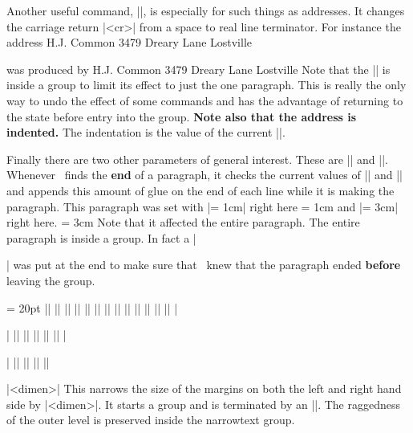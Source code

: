 Another useful command, |\obeylines|, is especially for such things as
addresses.
It changes the carriage return |<cr>| from a space to real line
terminator. For instance the address
\medskip
\vbox{
\begingroup
\obeylines
H.J. Common
3479 Dreary Lane
Lostville
\endgroup
}

\noindent
was produced by 
\begintt
\begingroup
\obeylines
H.J. Common
3479 Dreary Lane
Lostville
\endgroup
\endtt
\noindent
Note that the |\obeylines| is inside a group to limit its effect to just the
one paragraph. This is really the only way to undo the effect of some
commands and  has the advantage of returning to the state before entry into
the group. {\bf Note also that the address is indented.} 
The indentation is the
value of the current |\parindent|. 

\begingroup
Finally there are two other parameters of general interest. These are
|\rightskip| and |\leftskip|. Whenever \tex\ finds the {\bf end} of a
paragraph, it  checks  the current values of |\rightskip| and
|\leftskip| and appends this amount of glue on the end of each line while it
is  making the paragraph. This paragraph was set with |\rightskip = 1cm|
right here 
\rightskip = 1cm
and |\leftskip = 3cm| right here.
\leftskip = 3cm
Note that it affected the entire paragraph. The entire paragraph is inside a
group. In fact a |\par \endgroup| was put at the end to make sure that 
\tex\ knew that the paragraph ended {\bf before} leaving the group.
\par
\endgroup 


\beginthreecolumn
\hfuzz = 20pt
\ext|\beginnarrowtext|
\pri|\discretionary|
\ext|\endnarrowtext|
\pri|\everyparagraph|
\pri|\hangafter|
\pri|\hangindent|
\ext|\hyphenatecapitals|
\pri|\indent|
\pri|\leftskip|
\pri|\looseness|
\pri|\noindent|
\pla|\obeylines|
\pla|\obeyspaces|
\pri|\par|
\ext|\paragraphcenterline|
\pri|\parindent|
\pri|\parshape|
\pri|\parskip|
\pri|\pretolerance|
\pla|\raggedright|
\pri|\rightskip|
\pri|\tolerance|
\pla|\ttraggedright|
\ext|\veryraggedright|
\endthreecolumn


\beginblockmode

\mbr
\ext|\beginnarrowtext <dimen>|\]
\nbr
This narrows the size of the margins on both the left and right hand side by
|<dimen>|. It starts a group and is terminated by an |\endnarrowtext|. The
raggedness of the outer level is preserved inside the narrowtext group.


